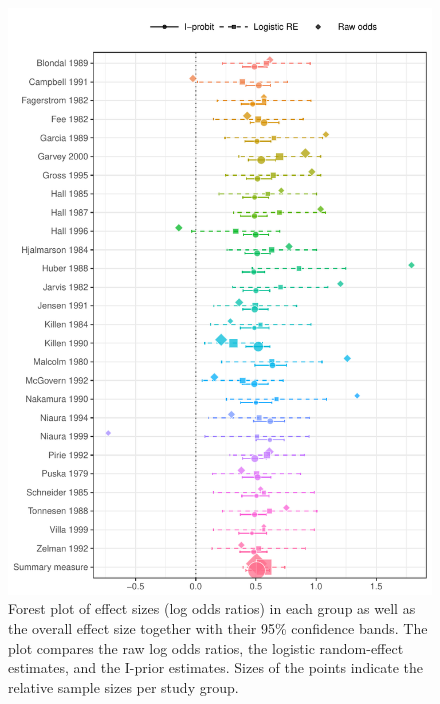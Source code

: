 \documentclass[showframe,11pt]{report}\usepackage[]{graphicx}\usepackage{xcolor}
\newenvironment{knitrout}{}{} %
\begin{document}
\begin{knitrout}
\color{fgcolor}\begin{figure}[p]

{\centering \includegraphics[width=\linewidth]{figure/05-smoke_forest_plot-1} 

}

\caption[Forest plot of effect sizes (log odds ratios) in each group as well as the overall effect size together with their 95\% confidence bands]{Forest plot of effect sizes (log odds ratios) in each group as well as the overall effect size together with their 95\% confidence bands. The plot compares the raw log odds ratios, the logistic random-effect estimates, and the I-prior estimates. Sizes of the points indicate the relative sample sizes per study group.}\label{fig:smoke.forest.plot}
\end{figure}


\end{knitrout}
\end{document}
